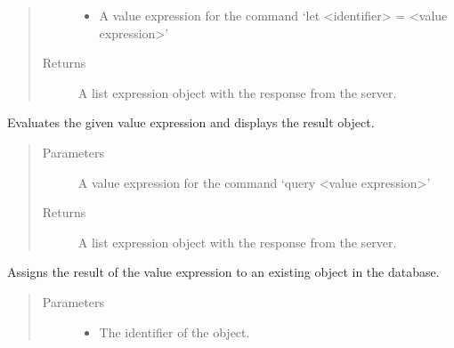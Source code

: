 \documentclass[letterpaper,10pt,english]{sphinxmanual}
\begin{document}
\begin{fulllineitems}
\begin{fulllineitems}
\begin{quote}
\begin{description}
\begin{itemize}
\item {} 
 \textendash{} A value expression for the command ‘let \textless{}identifier\textgreater{} = \textless{}value expression\textgreater{}’

\end{itemize}

\item[{Returns}] \leavevmode
A list expression object with the response from the  server.

\end{description}\end{quote}

\end{fulllineitems}


\begin{fulllineitems}
\label{\detokenize{index:secondodb.api.secondoapi.Cursor.execute_simple_query}}
Evaluates the given value expression and displays the result object.
\begin{quote}\begin{description}
\item[{Parameters}] \leavevmode
{} \textendash{} A value expression for the command ‘query \textless{}value expression\textgreater{}’

\item[{Returns}] \leavevmode
A list expression object with the response from the  server.

\end{description}\end{quote}

\end{fulllineitems}


\begin{fulllineitems}
\label{\detokenize{index:secondodb.api.secondoapi.Cursor.execute_update}}
Assigns the result of the value expression to an existing object in the database.
\begin{quote}\begin{description}
\item[{Parameters}] \leavevmode\begin{itemize}
\item {} 
 \textendash{} The identifier of the object.


\end{itemize}
\end{description}
\end{quote}
\end{fulllineitems}
\end{fulllineitems}
\end{document}
